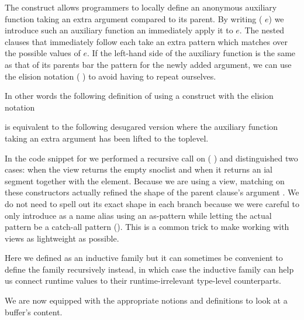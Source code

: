 \begin{remark}
  The  construct allows programmers to locally
  define an anonymous auxiliary function taking an extra argument
  compared to its parent.
  By writing ( \IdrisKeyword{(}$e$\IdrisKeyword{)})
  we introduce such an auxiliary function an immediately apply it to $e$.
  The nested clauses that immediately follow each take an extra pattern
  which matches over the possible values of $e$.
  If the left-hand side of the auxiliary function is the same as that of
  its parents bar the pattern for the newly added argument, we can use the
  elision notation (\IdrisKeyword{\_} \IdrisKeyword{|}) to avoid having to
  repeat ourselves.

  In other words the following definition of  using a
   construct with the elision notation


  \noindent is equivalent to the following desugared version where
  the auxiliary function 
  taking an extra argument has been lifted
  to the toplevel.


\end{remark}

In the code snippet for  we performed a recursive call on
( ) and distinguished
two cases: when the view returns the empty snoclist \IdrisData{[<]}
and when it returns an ial segment together with the
 element.
%
Because we are using a view, matching on these constructors actually
refined the shape of the parent clause's argument .
We do not need to spell out its exact shape in each branch because
we were careful to only introduce  as a name alias
using an as-pattern while letting the actual pattern be a catch-all
pattern (\IdrisKeyword{\_}).
%
This is a common trick to make working with views as lightweight as
possible.

Here we defined  as an inductive family but it can
sometimes be convenient to define the family recursively instead,
in which case the  inductive family can
help us connect runtime values to their
runtime-irrelevant type-level counterparts.



We are now equipped with the appropriate notions and definitions to
look at a buffer's content.
